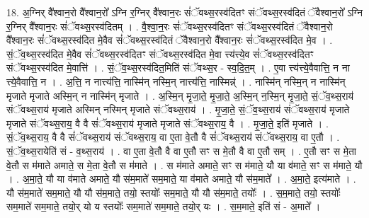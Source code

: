 \documentclass[17pt]{extarticle}
\begin{document}
18. अ॒ग्निर् वै᳚श्वान॒रो वै᳚श्वान॒रो᳚ ऽग्नि र॒ग्निर् वै᳚श्वान॒रः सं॑ॅवथ्स॒रस्व॑दितꣳ संॅवथ्स॒रस्व॑दितं ॅवैश्वान॒रो᳚ ऽग्नि र॒ग्निर् वै᳚श्वान॒रः सं॑ॅवथ्स॒रस्व॑दितम् । . वै॒श्वा॒न॒रः सं॑ॅवथ्स॒रस्व॑दितꣳ संॅवथ्स॒रस्व॑दितं ॅवैश्वान॒रो वै᳚श्वान॒रः सं॑ॅवथ्स॒रस्व॑दित मे॒वैव सं॑ॅवथ्स॒रस्व॑दितं ॅवैश्वान॒रो वै᳚श्वान॒रः सं॑ॅवथ्स॒रस्व॑दित मे॒व । . सं॒ॅव॒थ्स॒रस्व॑दित मे॒वैव सं॑ॅवथ्स॒रस्व॑दितꣳ संॅवथ्स॒रस्व॑दित मे॒वा त्त्य॑त्त्ये॒व सं॑ॅवथ्स॒रस्व॑दितꣳ संॅवथ्स॒रस्व॑दित मे॒वात्ति॑ । . सं॒ॅव॒थ्स॒रस्व॑दित॒मिति॑ संॅवथ्स॒र - स्व॒दि॒त॒म् । . ए॒वा त्त्य॑त्त्ये॒वैवात्ति॒ न ना त्त्ये॒वैवात्ति॒ न । . अ॒त्ति॒ न नात्त्य॑त्ति॒ नास्मि॑न् नस्मि॒न् नात्त्य॑त्ति॒ नास्मिन्न्॑ । . नास्मि॑न् नस्मि॒न् न नास्मि॑न् मृजाते मृजाते अस्मि॒न् न नास्मि॑न् मृजाते । . अ॒स्मि॒न् मृ॒जा॒ते॒ मृ॒जा॒ते॒ अ॒स्मि॒न् न॒स्मि॒न् मृ॒जा॒ते॒ सं॒ॅव॒थ्स॒राय॑ संॅवथ्स॒राय॑ मृजाते अस्मिन् नस्मिन् मृजाते संॅवथ्स॒राय॑ । . मृ॒जा॒ते॒ सं॒ॅव॒थ्स॒राय॑ संॅवथ्स॒राय॑ मृजाते मृजाते संॅवथ्स॒राय॒ वै वै सं॑ॅवथ्स॒राय॑ मृजाते मृजाते संॅवथ्स॒राय॒ वै । . मृ॒जा॒ते॒ इति॑ मृजाते । . सं॒ॅव॒थ्स॒राय॒ वै वै सं॑ॅवथ्स॒राय॑ संॅवथ्स॒राय॒ वा ए॒ता वे॒तौ वै सं॑ॅवथ्स॒राय॑ संॅवथ्स॒राय॒ वा ए॒तौ । . सं॒ॅव॒थ्स॒रायेति॑ सं - व॒थ्स॒राय॑ । . वा ए॒ता वे॒तौ वै वा ए॒तौ सꣳ स मे॒तौ वै वा ए॒तौ सम् । . ए॒तौ सꣳ स मे॒ता वे॒तौ स म॑माते अमाते॒ स मे॒ता वे॒तौ स म॑माते । . स म॑माते अमाते॒ सꣳ स म॑माते॒ यौ या व॑माते॒ सꣳ स म॑माते॒ यौ । . अ॒मा॒ते॒ यौ या व॑माते अमाते॒ यौ स॑म॒माते॑ सम॒माते॒ या व॑माते अमाते॒ यौ स॑म॒माते᳚ । . अ॒मा॒ते॒ इत्य॑माते । . यौ स॑म॒माते॑ सम॒माते॒ यौ यौ स॑म॒माते॒ तयो॒ स्तयोः᳚ सम॒माते॒ यौ यौ स॑म॒माते॒ तयोः᳚ । . स॒म॒माते॒ तयो॒ स्तयोः᳚ सम॒माते॑ सम॒माते॒ तयो॒र् यो य स्तयोः᳚ सम॒माते॑ सम॒माते॒ तयो॒र् यः । . स॒म॒माते॒ इति॑ सं - अ॒माते᳚ । \newline
\end{document}
